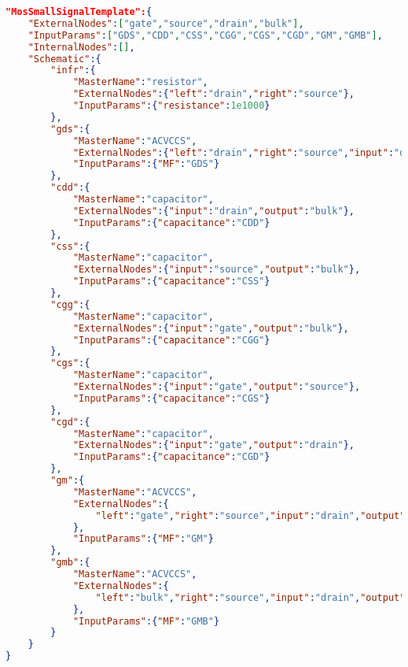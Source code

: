 \begin{lstlisting}[language=json,numbers=none,
caption={MosSmallSignalTemplate：小信号等效电路分解},label=lst:mos-small-signal-subckt]
"MosSmallSignalTemplate":{
    "ExternalNodes":["gate","source","drain","bulk"],
    "InputParams":["GDS","CDD","CSS","CGG","CGS","CGD","GM","GMB"],
    "InternalNodes":[],
    "Schematic":{
        "infr":{
            "MasterName":"resistor",
            "ExternalNodes":{"left":"drain","right":"source"},
            "InputParams":{"resistance":1e1000}
        },
        "gds":{
            "MasterName":"ACVCCS",
            "ExternalNodes":{"left":"drain","right":"source","input":"drain","output":"source"},
            "InputParams":{"MF":"GDS"}
        },
        "cdd":{
            "MasterName":"capacitor",
            "ExternalNodes":{"input":"drain","output":"bulk"},
            "InputParams":{"capacitance":"CDD"}
        },
        "css":{
            "MasterName":"capacitor",
            "ExternalNodes":{"input":"source","output":"bulk"},
            "InputParams":{"capacitance":"CSS"}
        },
        "cgg":{
            "MasterName":"capacitor",
            "ExternalNodes":{"input":"gate","output":"bulk"},
            "InputParams":{"capacitance":"CGG"}
        },
        "cgs":{
            "MasterName":"capacitor",
            "ExternalNodes":{"input":"gate","output":"source"},
            "InputParams":{"capacitance":"CGS"}
        },
        "cgd":{
            "MasterName":"capacitor",
            "ExternalNodes":{"input":"gate","output":"drain"},
            "InputParams":{"capacitance":"CGD"}
        },
        "gm":{
            "MasterName":"ACVCCS",
            "ExternalNodes":{
                "left":"gate","right":"source","input":"drain","output":"source"
            },
            "InputParams":{"MF":"GM"}
        },
        "gmb":{
            "MasterName":"ACVCCS",
            "ExternalNodes":{
                "left":"bulk","right":"source","input":"drain","output":"source"
            },
            "InputParams":{"MF":"GMB"}
        }
    }
}
\end{lstlisting}

